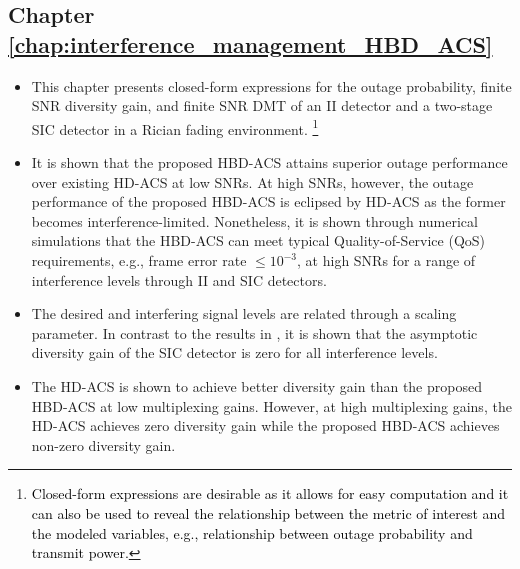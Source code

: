 \subsection{Chapter \ref{chap:interference_management_HBD_ACS}}
\begin{itemize}
	\item This chapter presents closed-form expressions for the outage probability, finite SNR diversity gain, and finite SNR DMT of an II detector and a two-stage SIC detector in a Rician fading environment. \textcolor{black}{\footnote{\textcolor{black}{Closed-form expressions are desirable as it allows for easy computation and it can also be used to reveal the relationship between the metric of interest and the modeled variables, e.g., relationship between outage probability and transmit power.}}}
	\item It is shown that the proposed HBD-ACS attains superior outage performance over existing HD-ACS at low SNRs. At high SNRs, however, the outage performance of the proposed HBD-ACS is eclipsed by HD-ACS as the former becomes interference-limited. Nonetheless, it is shown through numerical simulations that the HBD-ACS can meet typical Quality-of-Service (QoS) requirements, e.g., frame error rate $\leq 10^{-3}$, at high SNRs for a range of interference levels through II and SIC detectors. 
	\item The desired and interfering signal levels are related through a scaling parameter. In contrast to the results in \cite{sirigina2016symbol}, it is shown that the asymptotic diversity gain of the SIC detector is zero for all interference levels.
	\item The HD-ACS is shown to achieve better diversity gain than the proposed HBD-ACS at low multiplexing gains. However, at high multiplexing gains, the HD-ACS achieves zero diversity gain while the proposed HBD-ACS achieves non-zero diversity gain.
\end{itemize}

